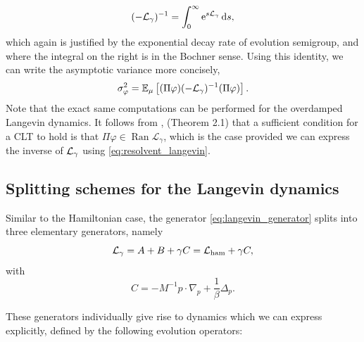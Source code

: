         \begin{equation}
            \label{eq:resolvent_langevin}
            (-\mathcal{L}_\gamma)^{-1}=\int_0^\infty \mathrm{e}^{s\mathcal{L}_\gamma}\,\mathrm{d} s,
        \end{equation}
        which again is justified by the exponential decay rate of evolution semigroup, and where the integral on the right is in the Bochner sense.
        Using this identity, we can write the asymptotic variance more concisely,
        \begin{equation}
            \label{eq:asymptotic_variance_with_Lm1}
            \sigma_{\varphi}^2=\mathbb{E}_{\mu}\left[(\Pi\varphi) (-\mathcal{L}_\gamma)^{-1}(\Pi \varphi)\right].
        \end{equation}
        Note that the exact same computations can be performed for the overdamped Langevin dynamics. 
        It follows from \cite{B82}, (Theorem 2.1) that a sufficient condition for a CLT to hold is that $\Pi \varphi\in \operatorname{Ran}\mathcal L_\gamma$, which is the case provided we can express the inverse of $\mathcal{L}_\gamma$ using \eqref{eq:resolvent_langevin}.
\subsection{Splitting schemes for the Langevin dynamics}\label{section:splitting_schemes_langevin}

Similar to the Hamiltonian case, the generator \eqref{eq:langevin_generator} splits into three elementary generators, namely 
$$\mathcal L_\gamma= A+B+\gamma C=\mathcal{L}_{\rm ham} +\gamma C,$$
with
\begin{equation}
  \label{eq:C_definition}
C=-M^{-1}p\cdot \nabla_p +\frac1\beta \Delta_p.
\end{equation}

These generators individually give rise to dynamics which we can express explicitly, defined by the following evolution operators:

